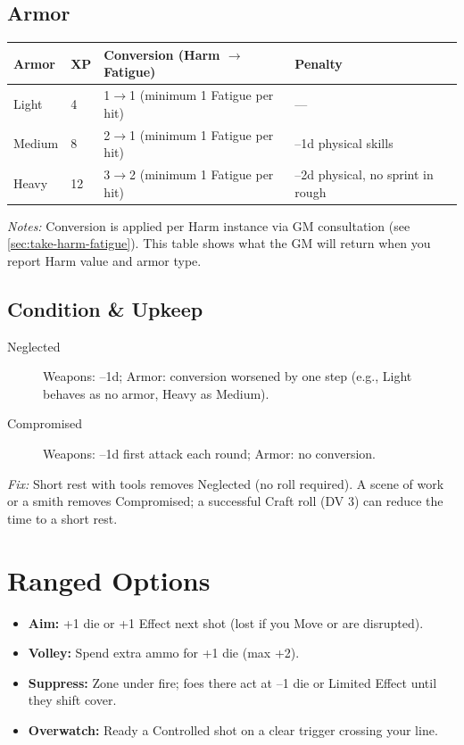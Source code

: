\subsection{Armor}
\label{sec:armor-table}
\begin{center}
\begin{tabular}{llll}
\toprule
\textbf{Armor} & \textbf{XP} & \textbf{Conversion (Harm $\rightarrow$ Fatigue)} & \textbf{Penalty} \\
\midrule
Light  & 4  & 1$\rightarrow$1 (minimum 1 Fatigue per hit) & --- \\
Medium & 8  & 2$\rightarrow$1 (minimum 1 Fatigue per hit) & --1d physical skills \\
Heavy  & 12 & 3$\rightarrow$2 (minimum 1 Fatigue per hit) & --2d physical, no sprint in rough \\
\bottomrule
\end{tabular}
\end{center}
\textit{Notes:} Conversion is applied per Harm instance via GM consultation (see \ref{sec:take-harm-fatigue}). This table shows what the GM will return when you report Harm value and armor type.

\subsection{Condition \& Upkeep}
\label{sec:equipment-condition}
\begin{description}
  \item[Neglected] Weapons: --1d; Armor: conversion worsened by one step (e.g., Light behaves as no armor, Heavy as Medium).
  \item[Compromised] Weapons: --1d first attack each round; Armor: no conversion.
\end{description}
\textit{Fix:} Short rest with tools removes Neglected (no roll required). A scene of work or a smith removes Compromised; a successful Craft roll (DV 3) can reduce the time to a short rest.

\section{Ranged Options}
\label{sec:ranged-options}
\begin{itemize}
  \item \textbf{Aim:} +1 die or +1 Effect next shot (lost if you Move or are disrupted).
  \item \textbf{Volley:} Spend extra ammo for +1 die (max +2).
  \item \textbf{Suppress:} Zone under fire; foes there act at --1 die or Limited Effect until they shift cover.
  \item \textbf{Overwatch:} Ready a Controlled shot on a clear trigger crossing your line.
\end{itemize}

